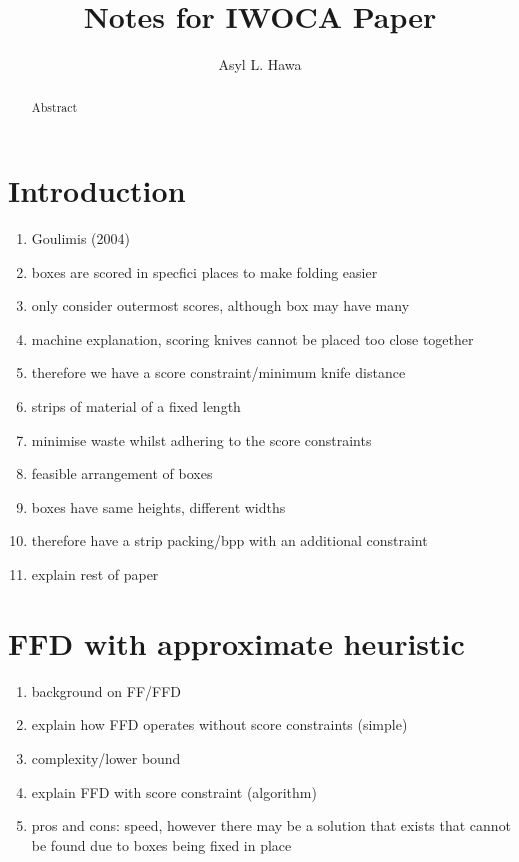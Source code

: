 \documentclass{llncs}
\title{Notes for IWOCA Paper}
\author{Asyl L. Hawa}
\begin{document}
\maketitle

\begin{abstract}
	Abstract
\end{abstract}

\section{Introduction}
\begin{enumerate}
	\item Goulimis (2004)
	\item boxes are scored in specfici places to make folding easier 
	\item only consider outermost scores, although box may have many 
	\item machine explanation, scoring knives cannot be placed too close together
	\item therefore we have a score constraint/minimum knife distance
	\item strips of material of a fixed length
	\item minimise waste whilst adhering to the score constraints
	\item feasible arrangement of boxes
	\item boxes have same heights, different widths
	\item therefore have a strip packing/bpp with an additional constraint
	\item explain rest of paper
\end{enumerate}


\section{FFD with approximate heuristic}
\begin{enumerate}
	\item background on FF/FFD
	\item explain how FFD operates without score constraints (simple)
	\item complexity/lower bound
	\item explain FFD with score constraint (algorithm)
	\item pros and cons: speed, however there may be a solution that exists that cannot be found due to boxes being fixed in place
\end{enumerate}
\end{document}

